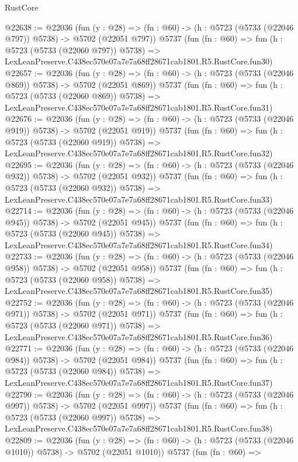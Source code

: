 \begin{lexlean}{RustCore}
\begin{coremodule}
@22638 := @22036
    (fun (y : @28) => (fn : @60) -> (h : @5723 (@5733 (@22046 @797)) @5738) -> @5702 (@22051 @797))
    @5737
    (fun (fn : @60) =>
    fun (h : @5723 (@5733 (@22060 @797)) @5738) =>
    LexLeanPreserve.C438ec570e07a7e7a68ff28671cab1801.R5.RustCore.fun30)
@22657 := @22036
    (fun (y : @28) => (fn : @60) -> (h : @5723 (@5733 (@22046 @869)) @5738) -> @5702 (@22051 @869))
    @5737
    (fun (fn : @60) =>
    fun (h : @5723 (@5733 (@22060 @869)) @5738) =>
    LexLeanPreserve.C438ec570e07a7e7a68ff28671cab1801.R5.RustCore.fun31)
@22676 := @22036
    (fun (y : @28) => (fn : @60) -> (h : @5723 (@5733 (@22046 @919)) @5738) -> @5702 (@22051 @919))
    @5737
    (fun (fn : @60) =>
    fun (h : @5723 (@5733 (@22060 @919)) @5738) =>
    LexLeanPreserve.C438ec570e07a7e7a68ff28671cab1801.R5.RustCore.fun32)
@22695 := @22036
    (fun (y : @28) => (fn : @60) -> (h : @5723 (@5733 (@22046 @932)) @5738) -> @5702 (@22051 @932))
    @5737
    (fun (fn : @60) =>
    fun (h : @5723 (@5733 (@22060 @932)) @5738) =>
    LexLeanPreserve.C438ec570e07a7e7a68ff28671cab1801.R5.RustCore.fun33)
@22714 := @22036
    (fun (y : @28) => (fn : @60) -> (h : @5723 (@5733 (@22046 @945)) @5738) -> @5702 (@22051 @945))
    @5737
    (fun (fn : @60) =>
    fun (h : @5723 (@5733 (@22060 @945)) @5738) =>
    LexLeanPreserve.C438ec570e07a7e7a68ff28671cab1801.R5.RustCore.fun34)
@22733 := @22036
    (fun (y : @28) => (fn : @60) -> (h : @5723 (@5733 (@22046 @958)) @5738) -> @5702 (@22051 @958))
    @5737
    (fun (fn : @60) =>
    fun (h : @5723 (@5733 (@22060 @958)) @5738) =>
    LexLeanPreserve.C438ec570e07a7e7a68ff28671cab1801.R5.RustCore.fun35)
@22752 := @22036
    (fun (y : @28) => (fn : @60) -> (h : @5723 (@5733 (@22046 @971)) @5738) -> @5702 (@22051 @971))
    @5737
    (fun (fn : @60) =>
    fun (h : @5723 (@5733 (@22060 @971)) @5738) =>
    LexLeanPreserve.C438ec570e07a7e7a68ff28671cab1801.R5.RustCore.fun36)
@22771 := @22036
    (fun (y : @28) => (fn : @60) -> (h : @5723 (@5733 (@22046 @984)) @5738) -> @5702 (@22051 @984))
    @5737
    (fun (fn : @60) =>
    fun (h : @5723 (@5733 (@22060 @984)) @5738) =>
    LexLeanPreserve.C438ec570e07a7e7a68ff28671cab1801.R5.RustCore.fun37)
@22790 := @22036
    (fun (y : @28) => (fn : @60) -> (h : @5723 (@5733 (@22046 @997)) @5738) -> @5702 (@22051 @997))
    @5737
    (fun (fn : @60) =>
    fun (h : @5723 (@5733 (@22060 @997)) @5738) =>
    LexLeanPreserve.C438ec570e07a7e7a68ff28671cab1801.R5.RustCore.fun38)
@22809 := @22036
    (fun (y : @28) =>
    (fn : @60) -> (h : @5723 (@5733 (@22046 @1010)) @5738) -> @5702 (@22051 @1010))
    @5737
    (fun (fn : @60) =>

\end{coremodule}
\end{lexlean}
